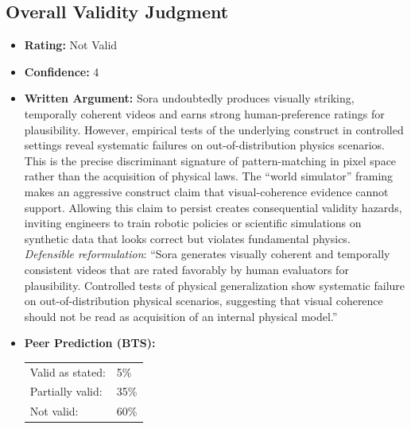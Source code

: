 \subsection{Overall Validity Judgment}
\begin{itemize}
    \item \textbf{Rating:} Not Valid
    \item \textbf{Confidence:} 4
    \item \textbf{Written Argument:} Sora undoubtedly produces visually striking, temporally coherent videos and earns strong human-preference ratings for plausibility. However, empirical tests of the underlying construct in controlled settings \citep{kang2024video} reveal systematic failures on out-of-distribution physics scenarios. This is the precise discriminant signature of pattern-matching in pixel space rather than the acquisition of physical laws. The ``world simulator'' framing makes an aggressive construct claim that visual-coherence evidence cannot support. Allowing this claim to persist creates consequential validity hazards, inviting engineers to train robotic policies or scientific simulations on synthetic data that looks correct but violates fundamental physics. \\
    \emph{Defensible reformulation}: ``Sora generates visually coherent and temporally consistent videos that are rated favorably by human evaluators for plausibility. Controlled tests of physical generalization \citep{kang2024video} show systematic failure on out-of-distribution physical scenarios, suggesting that visual coherence should not be read as acquisition of an internal physical model.''
    \item \textbf{Peer Prediction (BTS):}

    \begin{tabular}{ll}
        Valid as stated: & 5\% \\
        Partially valid: & 35\% \\
        Not valid: & 60\% \\
        \end{tabular}\\[4pt]
\end{itemize}
